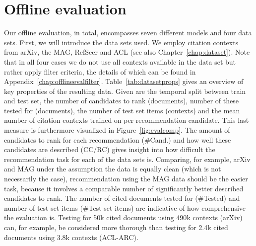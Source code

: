 \section{Offline evaluation}\label{sec:offeval}
Our offline evaluation, in total, encompasses seven different models and four data sets. First, we will introduce the data sets used. We  employ citation contexts from arXiv, the MAG, RefSeer and ACL (see also Chapter~\ref{chap:dataset}).
Note that in all four cases we do not use all contexts available in the data set but rather apply filter criteria, the details of which can be found in Appendix~\ref{chap:offlineevalfilter}.
Table~\ref{tab:datasetprops} gives an overview of key properties of the resulting data. Given are the temporal split between train and test set, the number of candidates to rank (documents), number of these tested for (documents), the number of test set items (contexts) and the mean number of citation contexts trained on per recommendation candidate. This last measure is furthermore visualized in Figure~\ref{fig:evalcomp}. The amount of candidates to rank for each recommendation (\#Cand.) and how well these candidates are described (CC/RC) gives insight into how difficult the recommendation task for each of the data sets is. Comparing, for example, arXiv and MAG under the assumption the data is equally clean (which is not necessarily the case), recommendation using the MAG data should be the easier task, because it involves a comparable number of significantly better described candidates to rank. The number of cited documents tested for (\#Tested) and number of test set items (\#Test set items) are indicative of how comprehensive the evaluation is. Testing for 50k cited documents using 490k contexts (arXiv) can, for example, be considered more thorough than testing for 2.4k cited documents using 3.8k contexts (ACL-ARC).


